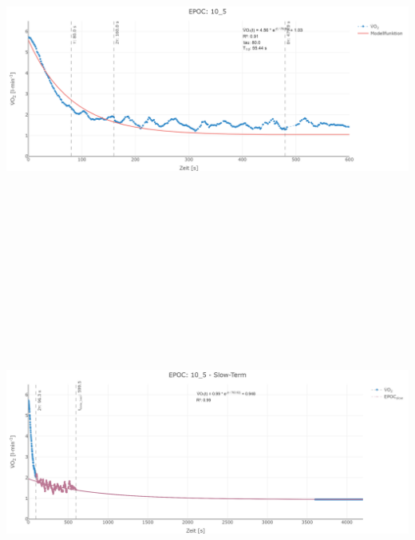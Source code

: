 \documentclass[
  letterpaper,
  DIV=11]{scrartcl}
\begin{document}
\includegraphics[width=11.45833in,height=4.6875in]{images/10_5_tau.png}
\includegraphics[width=11.45833in,height=4.6875in]{images/10_5_slow.png}
\end{document}
